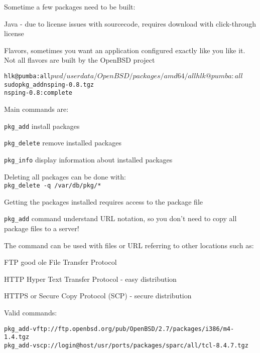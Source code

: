 \documentclass[18pt,landscape,a4paper]{foils}
\begin{document}

\begin{list1}
\item Sometime a few packages need to be built:
\item Java - due to license issues with sourcecode, requires download
  with click-through license  
\item Flavors, sometimes you want an application configured exactly
  like you like it. Not all flavors are built by the OpenBSD project
\end{list1}


\begin{alltt}
hlk@pumba:all$ pwd
/userdata/OpenBSD/packages/amd64/all
hlk@pumba:all$ sudo pkg_add nsping-0.8.tgz
nsping-0.8: complete               
\end{alltt}

\begin{list1}
\item Main commands are:
\begin{list2}
\item \verb+pkg_add+ install packages
\item \verb+pkg_delete+ remove installed packages
\item \verb+pkg_info+ display information about installed packages   
\end{list2}
\item Deleting all packages can be done with:\\ 
\verb+pkg_delete -q /var/db/pkg/*+
\end{list1}


\begin{list1}
\item Getting the packages installed requires access to the package
  file
\item \verb+pkg_add+ command understand URL notation, so you don't
  need to copy all package files to a server!
\item The command can be used with files or URL referring to other
  locations such as:
\begin{list2}
\item FTP good ole File Transfer Protocol
\item HTTP Hyper Text Transfer Protocol - easy distribution
\item HTTPS or Secure Copy Protocol (SCP) - secure distribution
\end{list2}
\item Valid commands:
\end{list1}
\begin{alltt}
\small
pkg_add -v ftp://ftp.openbsd.org/pub/OpenBSD/2.7/packages/i386/m4-1.4.tgz
pkg_add -v scp://login@host/usr/ports/packages/sparc/all/tcl-8.4.7.tgz  
\end{alltt}
\end{document}
